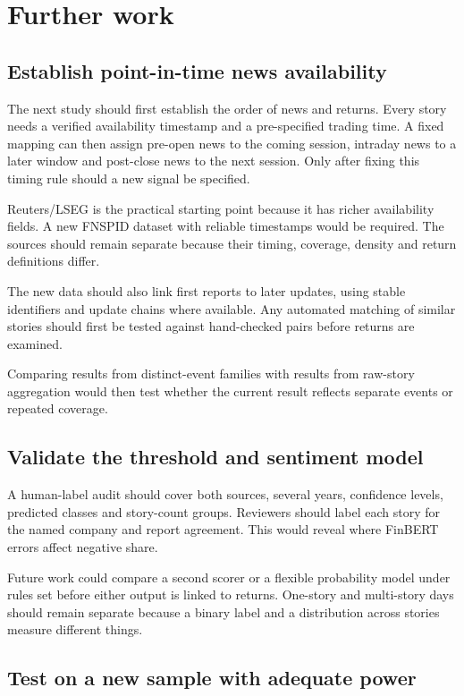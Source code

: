 \section{Further work}

\subsection{Establish point-in-time news availability}

The next study should first establish the order of news and returns. Every story
needs a verified availability timestamp and a pre-specified trading time. A
fixed mapping can then assign pre-open news to the coming session, intraday news
to a later window and post-close news to the next session. Only after fixing this
timing rule should a new signal be specified.

Reuters/LSEG is the practical starting point because it has richer availability
fields. A new FNSPID dataset with reliable timestamps would be required. The
sources should remain separate because their timing, coverage, density and
return definitions differ.

The new data should also link first reports to later updates, using stable
identifiers and update chains where available. Any automated matching of similar
stories should first be tested against hand-checked pairs before returns are
examined.

Comparing results from distinct-event families with results from raw-story
aggregation would then test whether the current result reflects separate events
or repeated coverage.

\subsection{Validate the threshold and sentiment model}

A human-label audit should cover both sources, several years, confidence levels,
predicted classes and story-count groups. Reviewers should label each story for
the named company and report agreement. This would reveal where FinBERT errors
affect negative share.

Future work could compare a second scorer or a flexible probability model under
rules set before either output is linked to returns. One-story and multi-story days
should remain separate because a binary label and a distribution across stories
measure different things.

\subsection{Test on a new sample with adequate power}

